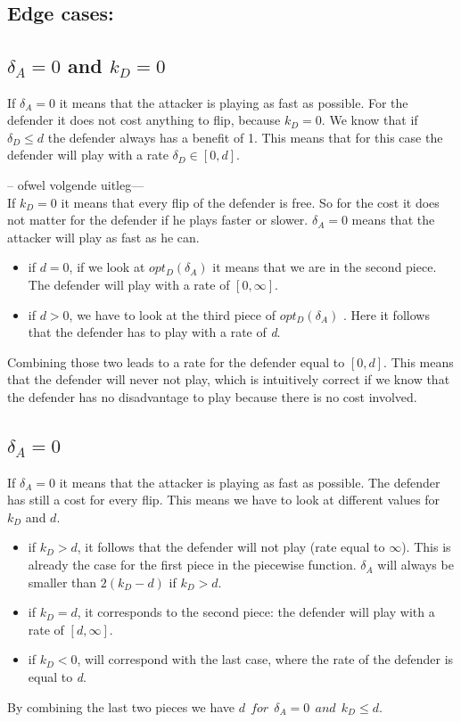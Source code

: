 ~~\\


\subsection*{Edge cases:}

\subsection*{$\delta_{A}=0$ and $k_{D}=0$}
If $\delta_{A}=0$ it means that the attacker is playing as fast as possible. For the defender it does not cost anything to flip, because $k_{D}=0$. We know that if $\delta_{D} \leq d$ the defender always has a benefit of 1. This means that for this case the defender will play with a rate $\delta_{D} \in [0,d]$.

-- ofwel volgende uitleg--- \\
If $k_{D}=0$ it means that every flip of the defender is free. So for the cost it does not matter for the defender if he plays faster or slower. $\delta_{A}=0$ means that the attacker will play as fast as he can.  
\begin{itemize}
\item if $d=0$, if we look at $opt_{D}(\delta_{A})$ it means that we are in the second piece. The defender will play with a rate of $[0,\infty]$. 
\item if $d >0$, we have to look at the third piece of  $opt_{D}(\delta_{A})$ . Here it follows that the defender has to play with a rate of \textit{d}.
\end{itemize}

Combining those two leads to a rate for the defender equal to $[0,d]$. This means that the defender will never not play, which is intuitively correct if we know that the defender has no disadvantage to play because there is no cost involved.
\subsection*{$\delta_{A}=0$}
If $\delta_{A}=0$ it means that the attacker is playing as fast as possible. The defender has still a cost for every flip. This means we have to look at different values for $k_{D}$ and $d$.
\begin{itemize}
\item if $k_{D} > d$, it follows that the defender will not play (rate equal to $\infty$). This is already the case for the first piece in the piecewise function. $\delta_{A}$ will always be smaller than $2(k_{D}-d)$ if $k_{D} > d.$
\item if $k_{D}=d$, it corresponds to the second piece: the defender will play with a rate of $[d,\infty]$.
\item if $k_{D} < 0$, will correspond with the last case, where the rate of the defender is equal to \textit{d}.
\end{itemize}
By combining the last two pieces we have  $d ~~for~~ \delta_{A} =0 ~~ and ~~k_{D} \leq d$.\\

